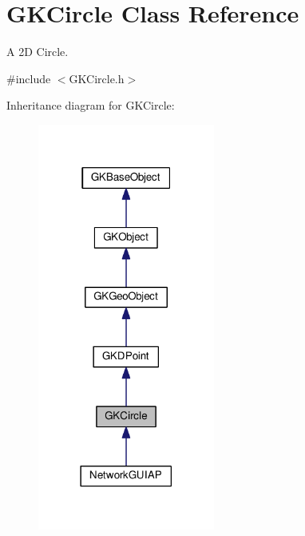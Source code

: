 \hypertarget{classGKCircle}{}\section{G\+K\+Circle Class Reference}
\label{classGKCircle}


A 2D Circle.  




{\ttfamily \#include $<$G\+K\+Circle.\+h$>$}



Inheritance diagram for G\+K\+Circle\+:
\nopagebreak
\begin{figure}[H]
\begin{center}
\leavevmode
\includegraphics[width=165pt]{classGKCircle__inherit__graph}
\end{center}
\end{figure}


